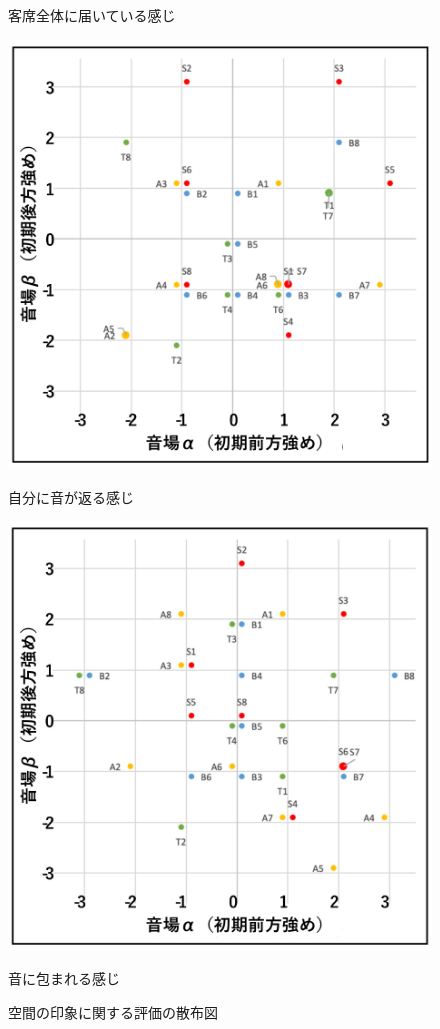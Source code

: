 \documentclass[11pt,a4j]{jreport}
\begin{document}
\begin{figure}[H]
\begin{minipage}{0.5\linewidth}
    \caption*{客席全体に届いている感じ}
  \end{minipage}
  \begin{minipage}{.5\linewidth}
    \centering
    \includegraphics[width=.9\linewidth]{images/subjectiveExp/scat_early_06returnSelf.pdf}
    \caption*{自分に音が返る感じ}
  \end{minipage}%
  \begin{minipage}{.5\linewidth}
    \centering
    \includegraphics[width=.9\linewidth]{images/subjectiveExp/scat_early_07surrounded.pdf}
    \caption*{音に包まれる感じ}
  \end{minipage}

  \caption{空間の印象に関する評価の散布図}
  \label{fig:空間の印象に関する評価の散布図}
\end{figure}
\end{document}
